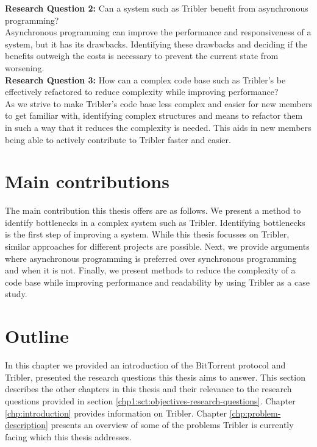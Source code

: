 \noindent
\textbf{Research Question 2:} Can a system such as Tribler benefit from asynchronous programming?\\

Asynchronous programming can improve the performance and responsiveness of a system, but it has its drawbacks. Identifying these drawbacks and deciding if the benefits outweigh the costs is necessary to prevent the current state from worsening. \\

\noindent
\textbf{Research Question 3:} How can a complex code base such as Tribler's be effectively refactored to reduce complexity while improving performance?\\

As we strive to make Tribler's code base less complex and easier for new members to get familiar with, identifying complex structures and means to refactor them in such a way that it reduces the complexity is needed.
This aids in new members being able to actively contribute to Tribler faster and easier.\

\section{Main contributions}
The main contribution this thesis offers are as follows. We present a method to identify bottlenecks in a complex system such as Tribler. Identifying bottlenecks is the first step of improving a system. While this thesis focusses on Tribler, similar approaches for different projects are possible.
Next, we provide arguments where asynchronous programming is preferred over synchronous programming and when it is not.
Finally, we present methods to reduce the complexity of a code base while improving performance and readability by using Tribler as a case study.


\section{Outline}
In this chapter we provided an introduction of the BitTorrent protocol and Tribler, presented the research questions this thesis aims to answer. This section describes the other chapters in this thesis and their relevance to the research questions provided in section \ref{chp1:sct:objectives-research-questions}.
Chapter \ref{chp:introduction} provides information on Tribler.
Chapter \ref{chp:problem-description} presents an overview of some of the problems Tribler is currently facing which this thesis addresses.

